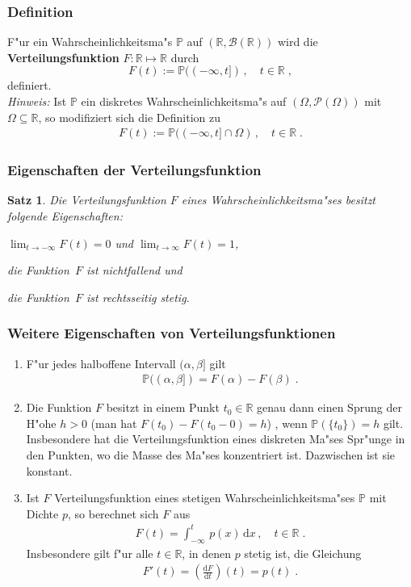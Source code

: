 \documentclass[ngerman,draft,parskip=half,twoside]{scrartcl}
\newtheorem{thm}{Satz}[section]
\newcommand*{\R}{\mathbb{R}}      %
\newcommand*{\BorelM}{\mathcal{B}}  %
\newcommand*{\PotM}{\mathcal{P}}    %
\newcommand*{\WKM}{\mathbb{P}}      %
\begin{document}
\subsubsection{Definition}
F"ur ein Wahrscheinlichkeitsma"s $\WKM$ auf $(\R,\BorelM(\R))$ wird die
\textbf{Verteilungsfunktion} $F\colon\R\mapsto\R$ durch
\begin{equation}
\label{F0}
F(t):=\WKM((-\infty,t])\,,\quad t\in\R  \;,
\end{equation}
definiert.\\
\textit{Hinweis:} Ist $\WKM$ ein diskretes Wahrscheinlichkeitsma"s auf $(\Omega,\PotM(\Omega))$ mit $\Omega\subseteq\R$,
so modifiziert sich die Definition zu
\begin{gather*}
  F(t):=\WKM((-\infty,t]\cap\Omega)\,,\quad t\in\R  \;.
\end{gather*}
\subsubsection{Eigenschaften der Verteilungsfunktion}
\begin{thm}
\label{VF}
Die Verteilungsfunktion $F$ eines Wahrscheinlichkeitsma"ses besitzt folgende Eigenschaften:
  \begin{eigenschaften}
   \item $\lim_{t\to -\infty} F(t)=0$ und $\lim_{t\to\infty} F(t)=1$,
   \item die Funktion~$F$ ist nichtfallend und
   \item die Funktion~$F$ ist rechtsseitig stetig.
  \end{eigenschaften}
\end{thm}
\subsubsection{Weitere Eigenschaften von Verteilungsfunktionen}
\begin{enumerate}[label=(\alph*)]
 \item
F"ur jedes halboffene Intervall $(\alpha,\beta]$ gilt
  \begin{gather*}
    \WKM((\alpha,\beta])= F(\alpha)-F(\beta)\;.
  \end{gather*}
 \item
Die Funktion $F$ besitzt in einem Punkt $t_0\in\R$ genau dann einen Sprung der H"ohe
$h>0$ (man hat $F(t_0)-F(t_0-0)=h$) , wenn $\WKM(\{t_0\})=h$ gilt. Insbesondere hat die
Verteilungsfunktion eines diskreten Ma"ses Spr"unge in den Punkten, wo die Masse
des Ma"ses konzentriert ist. Dazwischen ist sie konstant.
 \item
Ist $F$ Verteilungsfunktion eines stetigen Wahrscheinlichkeitsma"ses $\WKM$ mit Dichte $p$, so berechnet
sich $F$ aus
  \begin{gather*}
    F(t)=\int_{-\infty}^t\,p(x)\,\mathrm d x\,,\quad t\in\R\;.
  \end{gather*}
Insbesondere gilt f"ur alle $t\in\R$, in denen $p$ stetig ist, die Gleichung
  \begin{gather*}
    F'(t)=\left(\frac{\mathrm d F}{\mathrm d t} \right)(t)= p(t)\;.
  \end{gather*}
\end{enumerate}
\end{document}
